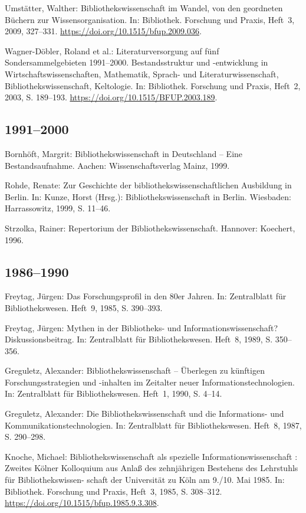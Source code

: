 \documentclass[a4paper,
fontsize=11pt,
oneside,
numbers=noperiodatend,
parskip=half-,
bibliography=totoc,
final
]{scrartcl}
\begin{document}
Umstätter, Walther: Bibliothekswissenschaft im Wandel, von den
geordneten Büchern zur Wissensorganisation. In: Bibliothek. Forschung
und Praxis, Heft~3, 2009, 327--331.
\url{https://doi.org/10.1515/bfup.2009.036}.

Wagner-Döbler, Roland et al.: Literaturversorgung auf fünf
Sondersammelgebieten 1991--2000. Bestandsstruktur und -entwicklung in
Wirtschaftswissenschaften, Mathematik, Sprach- und
Literaturwissenschaft, Bibliothekswissenschaft, Keltologie. In:
Bibliothek. Forschung und Praxis, Heft~2, 2003, S. 189--193.
\url{https://doi.org/10.1515/BFUP.2003.189}.

\hypertarget{section-1}{%
\subsection*{1991--2000}\label{section-1}}

Bornhöft, Margrit: Bibliothekswissenschaft in Deutschland -- Eine
Bestandsaufnahme. Aachen: Wissenschaftsverlag Mainz, 1999.

Rohde, Renate: Zur Geschichte der bibliothekswissenschaftlichen
Ausbildung in Berlin. In: Kunze, Horst (Hrsg.): Bibliothekswissenschaft
in Berlin. Wiesbaden: Harrassowitz, 1999, S. 11--46.

Strzolka, Rainer: Repertorium der Bibliothekswissenschaft. Hannover:
Koechert, 1996.

\hypertarget{section-2}{%
\subsection*{1986--1990}\label{section-2}}

Freytag, Jürgen: Das Forschungsprofil in den 80er Jahren. In:
Zentralblatt für Bibliothekswesen. Heft~9, 1985, S. 390--393.

Freytag, Jürgen: Mythen in der Bibliotheks- und
Informationswissenschaft? Diskussionsbeitrag. In: Zentralblatt für
Bibliothekswesen. Heft~8, 1989, S. 350--356.

Greguletz, Alexander: Bibliothekswissenschaft -- Überlegen zu künftigen
Forschungsstrategien und -inhalten im Zeitalter neuer
Informationstechnologien. In: Zentralblatt für Bibliothekswesen. Heft~1,
1990, S. 4--14.

Greguletz, Alexander: Die Bibliothekswissenschaft und die Informations-
und Kommunikationstechnologien. In: Zentralblatt für Bibliothekswesen.
Heft~8, 1987, S. 290--298.

Knoche, Michael: Bibliothekswissenschaft als spezielle
Informationswissenschaft : Zweites Kölner Kolloquium aus Anlaß des
zehnjährigen Bestehens des Lehrstuhls für Bibliothekswissen- schaft der
Universität zu Köln am 9./10. Mai 1985. In: Bibliothek. Forschung und
Praxis, Heft~3, 1985, S. 308--312.
\url{https://doi.org/10.1515/bfup.1985.9.3.308}.
\end{document}
